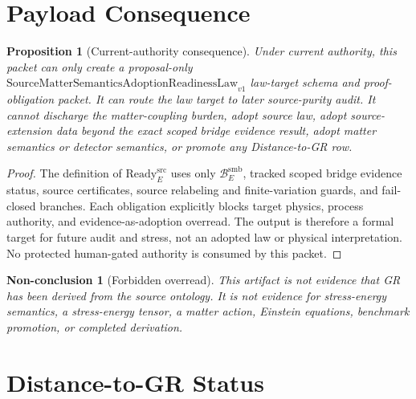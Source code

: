 \documentclass[11pt]{article}
\newcommand{\SMSAR}{\mathrm{SourceMatterSemanticsAdoptionReadinessLaw}_{v1}}
\newcommand{\BridgeDom}{\mathcal B^{\mathrm{smb}}_E}
\newcommand{\Ready}{\mathrm{Ready}^{\mathrm{src}}_E}
\newtheorem{proposition}{Proposition}
\newtheorem{nonconclusion}{Non-conclusion}
\begin{document}
\section{Payload Consequence}

\begin{proposition}[Current-authority consequence]
Under current authority, this packet can only create a proposal-only
\(\SMSAR\) law-target schema and proof-obligation packet. It can route the
law target to later source-purity audit. It cannot discharge the
matter-coupling burden, adopt source law, adopt source-extension data beyond
the exact scoped bridge evidence result, adopt matter semantics or detector
semantics, or promote any Distance-to-GR row.
\end{proposition}

\begin{proof}
The definition of \(\Ready\) uses only \(\BridgeDom\), tracked scoped bridge
evidence status, source certificates, source relabeling and finite-variation
guards, and fail-closed branches. Each obligation explicitly blocks target
physics, process authority, and evidence-as-adoption overread. The output is
therefore a formal target for future audit and stress, not an adopted law or
physical interpretation. No protected human-gated authority is consumed by
this packet.
\end{proof}

\begin{nonconclusion}[Forbidden overread]
This artifact is not evidence that GR has been derived from the source
ontology. It is not evidence for stress-energy semantics, a stress-energy
tensor, a matter action, Einstein equations, benchmark promotion, or completed
derivation.
\end{nonconclusion}

\section{Distance-to-GR Status}
\end{document}
